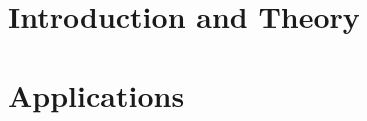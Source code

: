 \documentclass[11pt,a4paper,bibtotoc,idxtotoc,headsepline,footsepline,footexclude,BCOR12mm,DIV13]{scrbook}
\begin{document}
  
      \addtolength{\evensidemargin}{-12mm}

	\frontmatter
	
	
	
%	
%	
	
	
%	
	\clearemptydoublepage
	
	
 
	
	
	
	
	
	
%       

	\tableofcontents
  

	\mainmatter
	
	
		\part[Introduction and Theory]{Introduction and Theory}
		\label{part:introAndBackgroundTheory}

                
                

		
                
                

                                
		\part[Applications]{Applications}
		\label{part:secondP}
                
		

                
		
		
\end{document}
